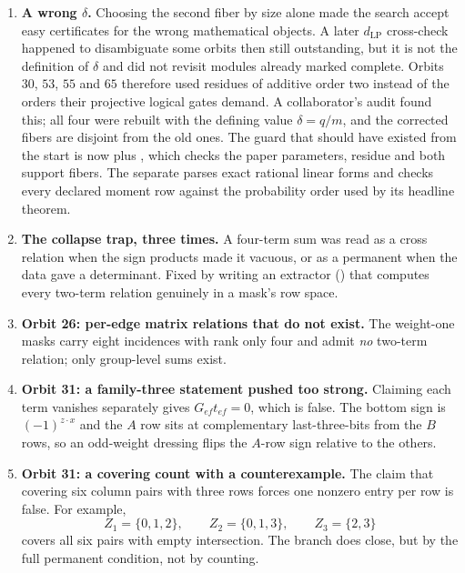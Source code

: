 \documentclass[11pt,a4paper]{article}
\theoremstyle{definition}
\begin{document}
\begin{enumerate}
\item \textbf{A wrong $\delta$.} Choosing the second fiber by size alone made the
  search accept easy certificates for the wrong mathematical objects. A later
  $d_{\mathrm{LP}}$ cross-check happened to disambiguate some orbits then still
  outstanding, but it is not the definition of $\delta$ and did not revisit
  modules already marked complete. Orbits $30$, $53$, $55$ and $65$ therefore
  used residues of additive order two instead of the orders their projective
  logical gates demand. A collaborator's audit found this; all four were rebuilt
  with the defining value $\delta=q/m$, and the corrected fibers are disjoint
  from the old ones. The guard that should have existed from the start is now
   plus , which checks
  the paper parameters, residue and both support fibers. The separate
   parses exact rational linear forms and
  checks every declared moment row against the probability order used by its
  headline theorem.
\item \textbf{The collapse trap, three times.} A four-term sum was read as a
  cross relation when the sign products made it vacuous, or as a permanent when
  the data gave a determinant. Fixed by writing an extractor
  () that computes every two-term relation genuinely
  in a mask's row space.
\item \textbf{Orbit 26: per-edge matrix relations that do not exist.} The
  weight-one masks carry eight incidences with rank only four and admit
  \emph{no} two-term relation; only group-level sums exist.
\item \textbf{Orbit 31: a family-three statement pushed too strong.} Claiming
  each term vanishes separately gives $G_{ef} t_{ef} = 0$, which is false. The
  bottom sign is $(-1)^{z \cdot x}$ and the $A$ row sits at complementary
  last-three-bits from the $B$ rows, so an odd-weight dressing flips the $A$-row
  sign relative to the others.
\item \textbf{Orbit 31: a covering count with a counterexample.} The claim that
  covering six column pairs with three rows forces one nonzero entry per row is
  false. For example,
  \[
    Z_1=\{0,1,2\},\qquad Z_2=\{0,1,3\},\qquad Z_3=\{2,3\}
  \]
  covers all six pairs with empty intersection. The branch does close, but by
  the full permanent condition, not by counting.
\end{enumerate}
\end{document}
